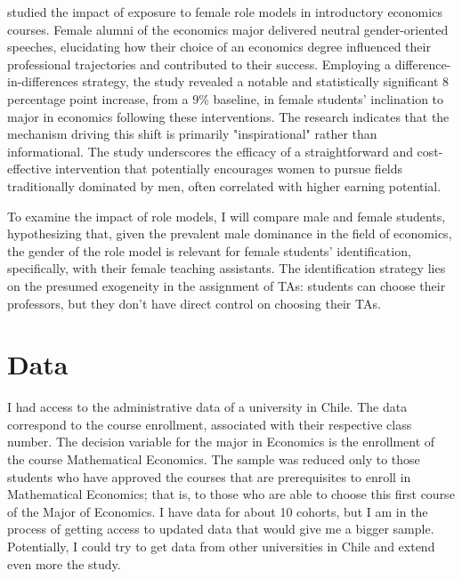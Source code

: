 \documentclass[12pt]{article}
\begin{document}
\citet{Porter2020} studied the impact of exposure to female role models in introductory economics courses. Female alumni of the economics major delivered neutral gender-oriented speeches, elucidating how their choice of an economics degree influenced their professional trajectories and contributed to their success. Employing a difference-in-differences strategy, the study revealed a notable and statistically significant 8 percentage point increase, from a 9\% baseline, in female students' inclination to major in economics following these interventions. The research indicates that the mechanism driving this shift is primarily "inspirational" rather than informational. The study underscores the efficacy of a straightforward and cost-effective intervention that potentially encourages women to pursue fields traditionally dominated by men, often correlated with higher earning potential.

To examine the impact of role models, I will compare male and female students, hypothesizing that, given the prevalent male dominance in the field of economics, the gender of the role model is relevant for female students' identification, specifically, with their female teaching assistants. The identification strategy lies on the presumed exogeneity  in the assignment of TAs: students can choose their professors, but they don't have direct control on choosing their TAs. 


\section{Data}
I had access to the administrative data of a university in Chile. The data correspond to the course enrollment, associated with their respective class number. The decision variable for the major in Economics is the enrollment of the course Mathematical Economics. The sample was reduced only to those students who have approved the courses that are prerequisites to enroll in Mathematical Economics; that is, to those who are able to choose this first course of the Major of Economics. I have data for about 10 cohorts, but I am in the process of getting access to updated data that would give me a bigger sample. Potentially, I could try to get data from other universities in Chile and extend even more the study. 


\end{document}
